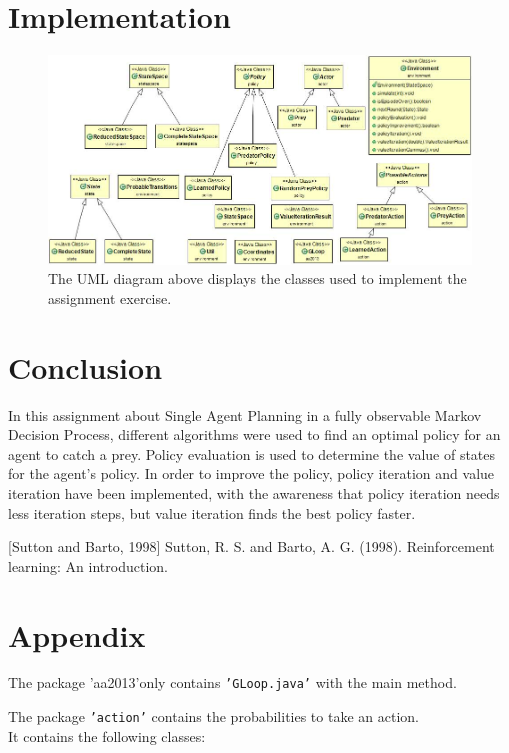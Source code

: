 \documentclass[11pt]{article}
\begin{document}
\section{Implementation} 
\begin{figure}[!ht]
\includegraphics[scale=0.5]{pic.jpg}
\caption{The UML diagram above displays the classes used to implement the assignment exercise.}
\label{UML}
\end{figure}


\section{Conclusion}
In this assignment about Single Agent Planning in a fully observable Markov Decision Process, different algorithms were used to find an optimal policy for an agent to catch a prey. Policy evaluation is used to determine the value of states for the agent's policy. In order to improve the policy, policy iteration and value iteration have been implemented, with the awareness that policy iteration needs less iteration steps, but value iteration finds the best policy faster.


\begin{thebibliography}{3}

[Sutton and Barto, 1998] Sutton, R. S. and Barto, A. G. (1998). Reinforcement learning: An introduction.

\end{thebibliography}




\section{Appendix}

The package 'aa2013'only contains \texttt{'GLoop.java'} with the main method.

The package \texttt{'action'} contains the probabilities to take an action.\\
It contains the  following classes:
\end{document}
